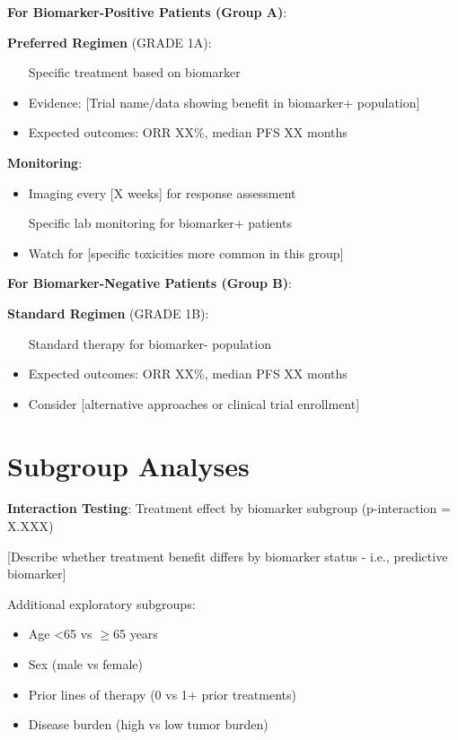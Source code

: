 \documentclass[10pt,letterpaper]{article}
\begin{document}
\begin{tcolorbox}[colback=highlightgreen!10,colframe=highlightgreen,title=\textbf{Treatment Recommendations},fonttitle=\bfseries\small]
{\small
\textbf{For Biomarker-Positive Patients (Group A)}:

\textbf{Preferred Regimen} (GRADE 1A):
\begin{itemize}
\item [Specific treatment based on biomarker]
\item Evidence: [Trial name/data showing benefit in biomarker+ population]
\item Expected outcomes: ORR XX\%, median PFS XX months
\end{itemize}

\textbf{Monitoring}:
\begin{itemize}
\item Imaging every [X weeks] for response assessment
\item [Specific lab monitoring for biomarker+ patients]
\item Watch for [specific toxicities more common in this group]
\end{itemize}

\textbf{For Biomarker-Negative Patients (Group B)}:

\textbf{Standard Regimen} (GRADE 1B):
\begin{itemize}
\item [Standard therapy for biomarker- population]
\item Expected outcomes: ORR XX\%, median PFS XX months
\item Consider [alternative approaches or clinical trial enrollment]
\end{itemize}
}
\end{tcolorbox}

\section{Subgroup Analyses}

\textbf{Interaction Testing}: Treatment effect by biomarker subgroup (p-interaction = X.XXX)

[Describe whether treatment benefit differs by biomarker status - i.e., predictive biomarker]

Additional exploratory subgroups:
\begin{itemize}
\item Age <65 vs $\geq$65 years
\item Sex (male vs female)
\item Prior lines of therapy (0 vs 1+ prior treatments)
\item Disease burden (high vs low tumor burden)
\end{itemize}
\end{document}
